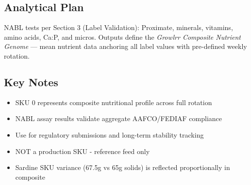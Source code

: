 \subsection*{Analytical Plan}
NABL tests per Section 3 (Label Validation): Proximate, minerals, vitamins, amino acids, Ca:P, and micros.  
Outputs define the \emph{Growlrr Composite Nutrient Genome} --- mean nutrient data anchoring all label values with pre-defined weekly rotation.

\subsection*{Key Notes}
\begin{itemize}
\item SKU 0 represents composite nutritional profile across full rotation
\item NABL assay results validate aggregate AAFCO/FEDIAF compliance
\item Use for regulatory submissions and long-term stability tracking
\item NOT a production SKU - reference feed only
\item Sardine SKU variance (67.5g vs 65g solids) is reflected proportionally in composite
\end{itemize}
